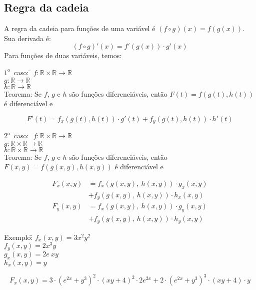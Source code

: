 \documentclass{article}
\begin{document}
\subsection{Regra da cadeia}
A regra da cadeia para funções de uma variável é $(f \circ g)(x) = f(g(x))$. Sua derivada é:
\[ (f \circ g)'(x) = f'(g(x)) \cdot g'(x) \]
Para funções de duas variáveis, temos:
\begin{tabbing}
  $1^{\text{o}}$\ caso: \= $f: \mathbb{R} \times \mathbb{R} \rightarrow \mathbb{R}$\\
  \>$g: \mathbb{R} \rightarrow \mathbb{R}$\\
  \>$h: \mathbb{R} \rightarrow \mathbb{R}$\\[5pt]
  \> Teorema: Se $f$, $g$ e $h$ são funções diferenciáveis, então $F(t) = f(g(t), h(t))$ é diferenciável e\\[5pt]
  \>\begin{minipage}{400pt}
      \[ F'(t) = f_x(g(t), h(t)) \cdot g'(t) + f_y(g(t), h(t)) \cdot h'(t) \]
  \end{minipage}
\end{tabbing}
\begin{tabbing}
  $2^{\text{o}}$\ caso: \= $f: \mathbb{R} \times \mathbb{R} \rightarrow \mathbb{R}$\\
  \>$g: \mathbb{R} \times \mathbb{R} \rightarrow \mathbb{R}$\\
  \>$h: \mathbb{R} \times \mathbb{R} \rightarrow \mathbb{R}$\\[5pt]
  \> Teorema: Se $f$, $g$ e $h$ são funções diferenciáveis, então $F(x, y) = f(g(x, y), h(x, y))$ é diferenciável e\\
  \>\begin{minipage}{400pt}
      \begin{align*}
        F_x(x,y) &= f_x(g(x,y),\ h(x,y)) \cdot g_x(x,y) \\
        &+ f_y(g(x,y),\ h(x,y)) \cdot h_x(x,y) \\[5pt]
        F_y(x,y) &= f_x(g(x,y),\ h(x,y)) \cdot g_y(x,y) \\
        &+ f_y(g(x,y),\ h(x,y)) \cdot h_y(x,y)
      \end{align*}
  \end{minipage}
\end{tabbing}
\pagebreak
\begin{tabbing}
  Exemplo:\= $f_x(x,y) = 3x^2y^2$\\
  \> $f_y(x,y) = 2x^3y$\\[5pt]
  \> $g_x(x,y) = 2e~{xy}$\\[5pt]
  \> $h_x(x,y) = y$\\[10pt]
  \>\begin{minipage}{400pt}
    \[ F_x(x,y) = 3 \cdot{(e^{2x} + y^3)}^2 \cdot {(xy + 4)}^2 \cdot 2e^{2x} + 2 \cdot {(e^{2x} + y^3)}^3 \cdot (xy + 4) \cdot y \]
  \end{minipage}
\end{tabbing}
\end{document}
